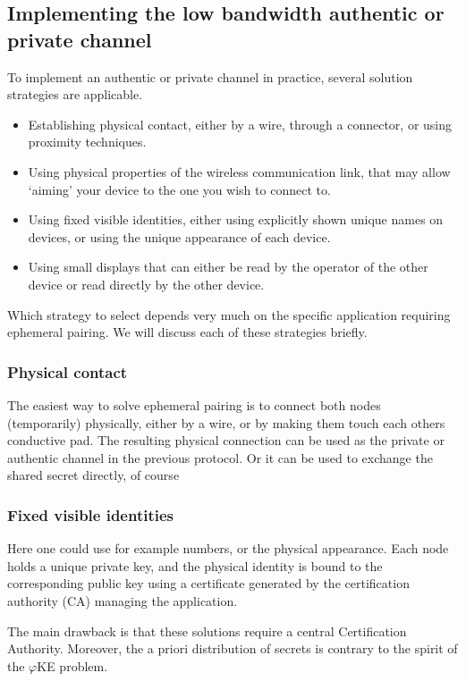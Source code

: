 \documentclass[runningheads,envcountsame,envcountsect,oribibl]{llncs}
\newcommand{\eke}{$\varphi$KE}
\begin{document}
\subsection{Implementing the low bandwidth authentic or private channel}

To implement an authentic or private channel in practice,
several solution stra\-te\-gies are applicable. 
\begin{itemize}
\item Establishing physical contact, either by a wire, through a connector, or
  using proximity techniques.
\item Using physical properties of the wireless communication link, that may
  allow `aiming' your device to the one you wish to connect to.
\item Using fixed visible identities, either using explicitly shown unique
  names on devices, or using the unique appearance of each device.
\item Using small displays that can either be read by the operator of the other
  device or read directly by the other device.
\end{itemize}
Which strategy to select depends very much on the specific application
requiring ephemeral pairing.
We will discuss each of these strategies briefly.

\subsubsection{Physical contact}

The easiest way to solve ephemeral pairing is to connect both nodes
(temporarily) physically, either by a wire, or by making them touch each others
conductive pad. The resulting physical connection can be used as the private or
authentic channel in the previous protocol. Or it can be used to
exchange the shared secret directly, of course

\subsubsection{Fixed visible identities}

Here one could use for example numbers, or the physical appearance. Each node
holds a unique private key, and the physical identity is bound to the
corresponding public key using a certificate generated by the certification
authority (CA) managing the application.

The main drawback is that these solutions require a central Certification
Authority. Moreover, the a priori distribution of secrets is contrary to the
spirit of the \eke{} problem.
\end{document}

